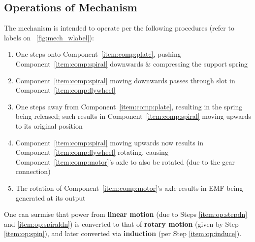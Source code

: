 \documentclass[conference]{IEEEtran}
\newcommand{\figref}[1]{\figurename~\ref{#1}}
\newcommand{\compref}[1]{Component~\ref{#1}}
\begin{document}
\subsection{Operations of Mechanism}
The mechanism is intended to operate per the following procedures (refer to labels on \figref{fig:mech_wlabel}):
\begin{enumerate}
    \item\label{item:op:stepdn} One steps onto \compref{item:comp:plate}, pushing \compref{item:comp:spiral} downwards \& compressing the support spring
    \item\label{item:op:spiraldn} \compref{item:comp:spiral} moving downwards passes through slot in \compref{item:comp:flywheel}
    \item\label{item:op:stepup} One steps away from \compref{item:comp:plate}, resulting in the spring being released; such results in \compref{item:comp:spiral} moving upwards to its original position
    \item\label{item:op:spin} \compref{item:comp:spiral} moving upwards now results in \compref{item:comp:flywheel} rotating, causing \compref{item:comp:motor}'s axle to also be rotated (due to the gear connection)
    \item\label{item:op:induce} The rotation of \compref{item:comp:motor}'s axle results in EMF being generated at its output
\end{enumerate}

One can surmise that power from \textbf{linear motion} (due to Steps \ref{item:op:stepdn} and \ref{item:op:spiraldn}) is converted to that of \textbf{rotary motion} (given by Step \ref{item:op:spin}), and later converted via \textbf{induction} (per Step \ref{item:op:induce}).


\end{document}
